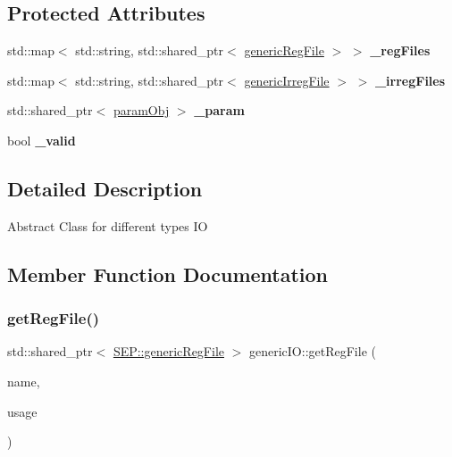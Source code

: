 \subsection*{Protected Attributes}
\begin{DoxyCompactItemize}
\item 
\mbox{\label{class_s_e_p_1_1generic_i_o_ab2c2c2461234e89619124a3b8ebbba22}} 
std\+::map$<$ std\+::string, std\+::shared\+\_\+ptr$<$ \hyperlink{class_s_e_p_1_1generic_reg_file}{generic\+Reg\+File} $>$ $>$ {\bfseries \+\_\+reg\+Files}
\item 
\mbox{\label{class_s_e_p_1_1generic_i_o_a57b4858da37febcc834b28dbb28ef410}} 
std\+::map$<$ std\+::string, std\+::shared\+\_\+ptr$<$ \hyperlink{class_s_e_p_1_1generic_irreg_file}{generic\+Irreg\+File} $>$ $>$ {\bfseries \+\_\+irreg\+Files}
\item 
\mbox{\label{class_s_e_p_1_1generic_i_o_a2243e616bec61049e752cb68be9ec7e4}} 
std\+::shared\+\_\+ptr$<$ \hyperlink{class_s_e_p_1_1param_obj}{param\+Obj} $>$ {\bfseries \+\_\+param}
\item 
\mbox{\label{class_s_e_p_1_1generic_i_o_a934c9b97d0ac456c5b54497af3290c4c}} 
bool {\bfseries \+\_\+valid}
\end{DoxyCompactItemize}


\subsection{Detailed Description}
Abstract Class for different types IO 

\subsection{Member Function Documentation}
\mbox{\label{class_s_e_p_1_1generic_i_o_a0c6d0460f20f8a35603757925a529f4c}} 
\subsubsection{\texorpdfstring{get\+Reg\+File()}{getRegFile()}}
{\footnotesize\ttfamily std\+::shared\+\_\+ptr$<$ \hyperlink{class_s_e_p_1_1generic_reg_file}{S\+E\+P\+::generic\+Reg\+File} $>$ generic\+I\+O\+::get\+Reg\+File (\begin{DoxyParamCaption}\item[{const std\+::string \&}]{name,  }\item[{const S\+E\+P\+::usage\+\_\+code}]{usage }\end{DoxyParamCaption})}



